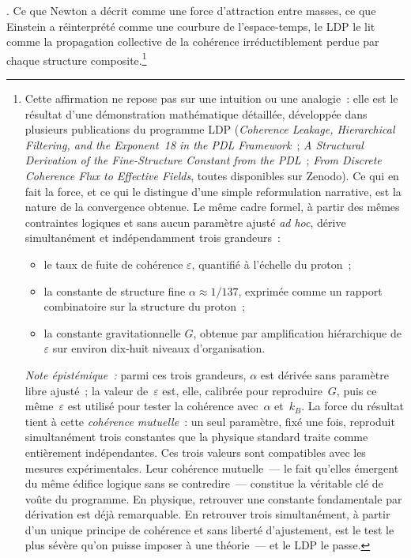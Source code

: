 \documentclass[12pt, a4paper, openright]{book}
\begin{document}
. Ce que Newton a décrit comme une force d'attraction entre masses, ce que Einstein a réinterprété comme une courbure de l'espace-temps, le LDP le lit comme la propagation collective de la cohérence irréductiblement perdue par chaque structure composite.\footnote{%
  Cette affirmation ne repose pas sur une intuition ou une analogie~: elle est le résultat d'une démonstration mathématique détaillée, développée dans plusieurs publications du programme LDP (\textit{Coherence Leakage, Hierarchical Filtering, and the Exponent~18 in the PDL Framework}~; \textit{A Structural Derivation of the Fine-Structure Constant from the PDL}~; \textit{From Discrete Coherence Flux to Effective Fields}, toutes disponibles sur Zenodo). Ce qui en fait la force, et ce qui le distingue d'une simple reformulation narrative, est la nature de la convergence obtenue. Le même cadre formel, à partir des mêmes contraintes logiques et sans aucun paramètre ajusté \emph{ad hoc}, dérive simultanément et indépendamment trois grandeurs~:
  \begin{itemize}
  \item le taux de fuite de cohérence $\varepsilon$, quantifié à l'échelle du proton~;
  \item la constante de structure fine $\alpha \approx 1/137$, exprimée comme un rapport combinatoire sur la structure du proton~;
  \item la constante gravitationnelle $G$, obtenue par amplification hiérarchique de $\varepsilon$ sur environ dix-huit niveaux d'organisation.
  \end{itemize}
\textit{Note épistémique~:} parmi ces trois grandeurs, $\alpha$ est dérivée sans paramètre libre ajusté~; la valeur de~$\varepsilon$ est, elle, calibrée pour reproduire~$G$, puis ce même~$\varepsilon$ est utilisé pour tester la cohérence avec~$\alpha$ et~$k_B$. La force du résultat tient à cette \emph{cohérence mutuelle}~: un seul paramètre, fixé une fois, reproduit simultanément trois constantes que la physique standard traite comme entièrement indépendantes. Ces trois valeurs sont compatibles avec les mesures expérimentales. Leur cohérence mutuelle~--- le fait qu'elles émergent du même édifice logique sans se contredire~--- constitue la véritable clé de voûte du programme. En physique, retrouver une constante fondamentale par dérivation est déjà remarquable. En retrouver trois simultanément, à partir d'un unique principe de cohérence et sans liberté d'ajustement, est le test le plus sévère qu'on puisse imposer à une théorie~--- et le LDP le passe.}
\end{document}
